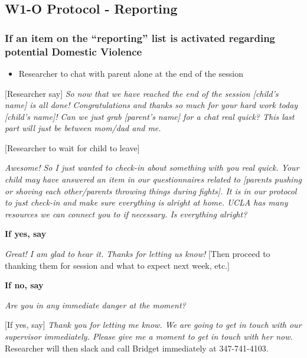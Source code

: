 \documentclass[]{book}
\providecommand{\tightlist}{%
  \setlength{\itemsep}{0pt}\setlength{\parskip}{0pt}}
\begin{document}
\hypertarget{w1-o-protocol---reporting}{%
\subsection{W1-O Protocol - Reporting}\label{w1-o-protocol---reporting}}

\hypertarget{if-an-item-on-the-reporting-list-is-activated-regarding-potential-domestic-violence}{%
\subsubsection{If an item on the ``reporting'' list is activated regarding potential Domestic Violence}\label{if-an-item-on-the-reporting-list-is-activated-regarding-potential-domestic-violence}}

\begin{itemize}
\tightlist
\item
  Researcher to chat with parent alone at the end of the session
\end{itemize}

{[}Researcher say{]} \emph{So now that we have reached the end of the session {[}child's name{]} is all done! Congratulations and thanks so much for your hard work today {[}child's name{]}! Can we just grab {[}parent's name{]} for a chat real quick? This last part will just be between mom/dad and me.}

{[}Researcher to wait for child to leave{]}

\emph{Awesome! So I just wanted to check-in about something with you real quick. Your child may have answered an item in our questionnaires related to {[}parents pushing or shoving each other/parents throwing things during fights{]}. It is in our protocol to just check-in and make sure everything is alright at home. UCLA has many resources we can connect you to if necessary. Is everything alright?}

\textbf{If yes, say}

\emph{Great! I am glad to hear it. Thanks for letting us know!} {[}Then proceed to thanking them for session and what to expect next week, etc.{]}

\textbf{If no, say}

\emph{Are you in any immediate danger at the moment?}

{[}If yes, say{]} \emph{Thank you for letting me know. We are going to get in touch with our supervisor immediately. Please give me a moment to get in touch with her now.} Researcher will then slack and call Bridget immediately at 347-741-4103.
\end{document}
